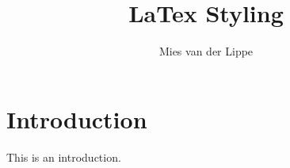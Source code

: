 \documentclass{report}
\author{Mies van der Lippe}
\title{LaTex Styling}
\begin{document}

\tableofcontents
\newpage

\section{Introduction}
This is an introduction. 
\end{document}
